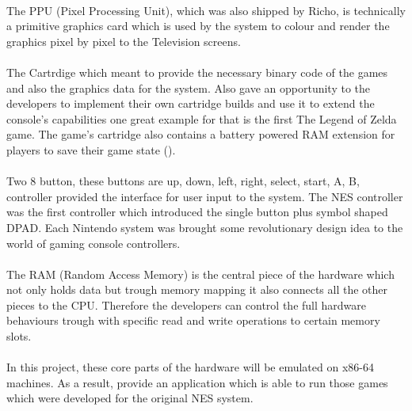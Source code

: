 \documentclass[]{report}
\begin{document}
\paragraph{ }
The PPU (Pixel Processing Unit), which was also shipped by Richo, is technically a primitive graphics card which is used by the system to colour and render the graphics pixel by pixel to the Television screens.
\paragraph{ }
The Cartrdige which meant to provide the necessary binary code of the games and also the graphics data for the system. Also gave an opportunity to the developers to implement their own cartridge builds and use it to extend the console's capabilities one great example for that is the first The Legend of Zelda game. The game's cartridge also contains a battery powered RAM extension for players to save their game state (\cite{ZELD}).
\paragraph{ }
Two 8 button, these buttons are up, down, left, right, select, start, A, B, controller provided the interface for user input to the system. The NES controller was the first controller which introduced the single button plus symbol shaped DPAD. Each Nintendo system was brought some revolutionary design idea to the world of gaming console controllers.
\paragraph{ }
The RAM (Random Access Memory) is the central piece of the hardware which not only holds data but trough memory mapping it also connects all the other pieces to the CPU. Therefore the developers can control the full hardware behaviours trough with specific read and write operations to certain memory slots.
\paragraph{ }
In this project, these core parts of the hardware will be emulated on x86-64 machines. As a result, provide an application which is able to run those games which were developed for the original NES system.
\end{document}
